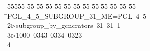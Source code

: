 %
%
\begin{tabbing}
55555 \= 55 \= 55 \= 55 \= 55 \= 55 \= 55 \= 55 \= 55 \= 55 \= 55 \= 55 \= 55 \= \>PGL\_4\_5\_SUBGROUP\_31\_ME=PGL\ 4\ 5\ \\[0pt]
2\>$\triangleright$\>subgroup\_by\_generators\ 31\ 31\ 1\ \\[0pt]
3\>$\triangleright$\>1000\ 0343\ 0334\ 0323\\[0pt]
4\>\end{tabbing}
